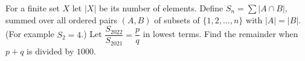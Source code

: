 For a finite set $X$ let $|X|$ be its number of elements. Define $S_n=\sum|A\cap B|$, summed over all ordered pairs $(A,B)$ of subsets of $\{1,2,\dots,n\}$ with $|A|=|B|$. (For example $S_2=4$.) Let $\dfrac{S_{2022}}{S_{2021}}=\dfrac pq$ in lowest terms. Find the remainder when $p+q$ is divided by $1000$.
